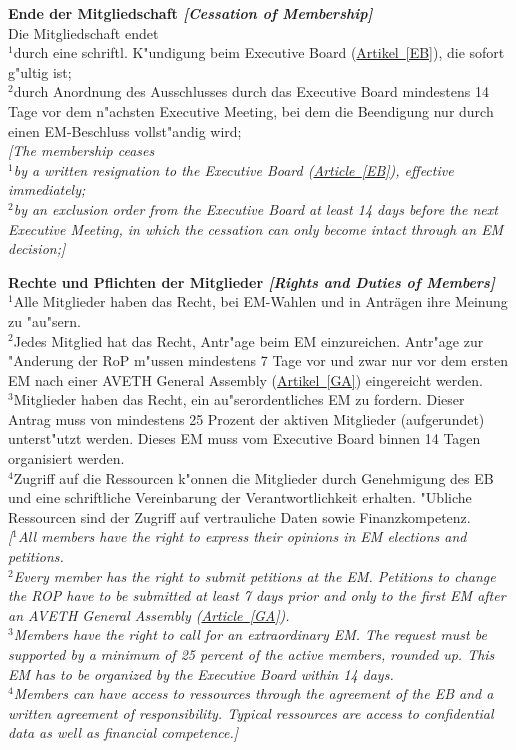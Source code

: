 \documentclass[10pt]{article}
\newcounter{qcounter}
\begin{document}
\begin{list}{{\bf Artikel :~}}{}
\item {\bf Ende der Mitgliedschaft {\it[Cessation of Membership]}}\\ \label{cessation}
Die Mitgliedschaft endet\\
$^{1}$durch eine schriftl. K"undigung beim Executive Board (\hyperref[EB]{Artikel~\ref{EB}}), die sofort g"ultig ist;\\
$^{2}$durch Anordnung des Ausschlusses durch das Executive Board mindestens 14 Tage vor dem n"achsten Executive Meeting, bei dem die Beendigung nur durch einen EM-Beschluss vollst"andig wird;\\
{\it[The membership ceases\\ 
$^{1}$by a written resignation to the Executive Board (\hyperref[EB]{Article~\ref{EB}}), effective immediately;\\
$^{2}$by an exclusion order from the Executive Board at least 14 days before the next Executive Meeting, in which the cessation can only become intact through an EM decision;]}

\item {\bf Rechte und Pflichten der Mitglieder {\it[Rights and Duties of Members]}}\label{Duties}\\
$^{1}$Alle Mitglieder haben das Recht, bei EM-Wahlen und in Anträgen ihre Meinung zu "au"sern. \\
$^{2}$Jedes Mitglied hat das Recht, Antr"age beim EM einzureichen. Antr"age zur "Anderung der RoP m"ussen mindestens 7 Tage vor und zwar nur vor dem ersten EM nach einer AVETH General Assembly (\hyperref[GA]{Artikel~\ref{GA}}) eingereicht werden.\\
$^{3}$Mitglieder haben das Recht, ein au"serordentliches EM zu fordern. Dieser Antrag muss von mindestens 25 Prozent der aktiven Mitglieder (aufgerundet) unterst"utzt werden. Dieses EM muss vom Executive Board binnen 14 Tagen organisiert werden.\\
$^{4}$Zugriff auf die Ressourcen k"onnen die Mitglieder durch Genehmigung des EB und eine schriftliche
Vereinbarung der Verantwortlichkeit erhalten. "Ubliche Ressourcen sind der Zugriff auf vertrauliche Daten sowie Finanzkompetenz.\\
{\it[$^{1}$All members have the right to express their opinions in EM elections and petitions.\\
$^{2}$Every member has the right to submit petitions at the EM. Petitions to change the ROP have to be submitted at least 7 days prior and only to the first EM after an AVETH General Assembly (\hyperref[GA]{Article~\ref{GA}}).\\
$^{3}$Members have the right to call for an extraordinary EM. The request must be supported by a minimum of 25 percent of the active members, rounded up. This EM has to be organized by the Executive Board within 14 days.\\
$^{4}$Members can have access to ressources through the agreement of the EB and a written agreement of responsibility. Typical ressources are access to confidential data as well as financial competence.]}


\end{list}
\end{document}
